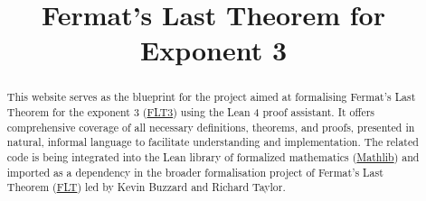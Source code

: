 \documentclass{report}
\title{Fermat's Last Theorem for Exponent 3}
\begin{document}
\maketitle

\begin{abstract}
    This website serves as the blueprint for the project aimed at formalising Fermat’s Last Theorem
    for the exponent 3 (\href{https://github.com/pitmonticone/FLT3}{FLT3}) using the Lean 4 proof assistant.
    It offers comprehensive coverage of all necessary definitions, theorems, and proofs, presented in natural,
    informal language to facilitate understanding and implementation. The related code is being integrated
    into the Lean library of formalized mathematics (\href{https://github.com/leanprover-community/mathlib4}{Mathlib})
    and imported as a dependency in the broader formalisation project of Fermat's Last Theorem
    (\href{https://github.com/ImperialCollegeLondon/FLT}{FLT}) led by Kevin Buzzard and Richard Taylor.
\end{abstract}



\end{document}
